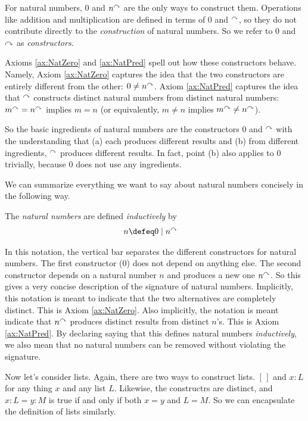 For natural numbers, $0$ and $n^\curvearrowright$ are the only ways to construct
them. Operations like addition and multiplication are
defined in terms of $0$ and ${}^\curvearrowright$, so they do not contribute directly
to the \emph{construction} of natural numbers. So
we refer to $0$ and $\curvearrowright$ as \emph{constructors}.

Axioms \ref{ax:NatZero} and \ref{ax:NatPred} spell out how these
constructors behave.  Namely, Axiom \ref{ax:NatZero} captures the idea that
the two constructors are entirely different from the other: $0\neq n^\curvearrowright$.
Axiom \ref{ax:NatPred} captures the idea that ${}^\curvearrowright$ constructs
distinct natural numbers from distinct natural numbers: $m^\curvearrowright =
n^\curvearrowright$ implies $m=n$ (or equivalently, $m\neq n$ implies $m^\curvearrowright\neq n^\curvearrowright$).

So the basic ingredients of natural numbers are the constructors $0$
and ${}^\curvearrowright$ with the understanding that (a) each produces
different results and (b) from different ingredients, ${}^\curvearrowright$
produces different results. In fact, point (b) also applies to $0$
trivially, because $0$ does not use any ingredients.

We can summarize everything we want to say about natural numbers
concisely in the following way.

\begin{defn}
  The \emph{natural numbers} are defined \emph{inductively} by
  \begin{align*}
    n &\defeq 0 \mathrel{\mid} n^\nxt
  \end{align*}
\end{defn}

In this notation, the vertical bar separates the different constructors for
natural numbers.  The first constructor ($0$) does not depend on
anything else. The second constructor depends on a natural number $n$
and produces a new one $n^\curvearrowright$. So this gives a very concise description of the signature of natural numbers.
Implicitly, this notation is meant to
indicate that the two alternatives are completely distinct. This is
Axiom \ref{ax:NatZero}.  Also implicitly, the notation is meant indicate that $n^\curvearrowright$
produces distinct results from distinct $n$'s.  This is Axiom
\ref{ax:NatPred}.  By declaring saying that this defines natural numbers
\emph{inductively}, we also mean that no natural numbers can be removed without violating
the signature.

Now let's consider lists. Again, there are two ways to construct lists. $[\,]$ and $x:L$ for any thing $x$
and any list $L$. Likewise, the constructrs are distinct, and $x:L=y:M$ is true if and only if
both $x=y$ and $L=M$. So we can encapsulate the definition of lists similarly.

